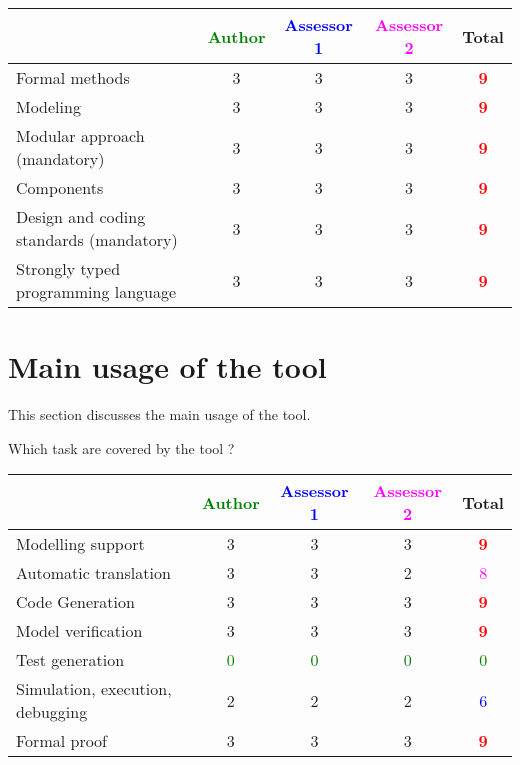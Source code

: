 \begin{tabular}{|l | c | c | c | c|}
\hline
& \textcolor{green}{Author} & \textcolor{blue}{Assessor 1} & \textcolor{magenta}{Assessor 2} & Total \\
\hline
Formal methods  & 3     & 3     & 3     & \textcolor{red}{\textbf{9}} \\
\hline 
Modeling  & 3     & 3     & 3     & \textcolor{red}{\textbf{9}} \\
\hline
Modular approach (mandatory) & 3     & 3     & 3     & \textcolor{red}{\textbf{9}} \\
\hline
Components & 3     & 3     & 3     & \textcolor{red}{\textbf{9}} \\
\hline
Design and coding standards (mandatory) & 3     & 3     & 3     & \textcolor{red}{\textbf{9}} \\
\hline
Strongly typed programming language & 3     & 3     & 3     & \textcolor{red}{\textbf{9}} \\
\hline

\end{tabular}



\section{Main usage of the tool}
\label{main_usage}

This section discusses the main usage of the tool.

Which task are covered by the tool ?


\begin{tabular}{|l | c | c | c | c|}
\hline
& \textcolor{green}{Author} & \textcolor{blue}{Assessor 1} & \textcolor{magenta}{Assessor 2} & Total \\
\hline 
Modelling support & 3     & 3     & 3     & \textcolor{red}{\textbf{9}} \\
\hline
Automatic translation  & 3     & 3     & 2     & \textcolor{magenta}{8} \\
\hline
Code Generation  & 3     & 3     & 3     & \textcolor{red}{\textbf{9}} \\
\hline
Model verification & 3     & 3     & 3      & \textcolor{red}{\textbf{9}} \\
\hline
Test generation & \textcolor{green}{0} & \textcolor{green}{0} & \textcolor{green}{0} & \textcolor{green}{0} \\
\hline
Simulation, execution, debugging & 2      & 2     & 2     & \textcolor{blue}{6} \\
\hline
Formal proof & 3     & 3     & 3     & \textcolor{red}{\textbf{9}} \\
\hline
\end{tabular}

